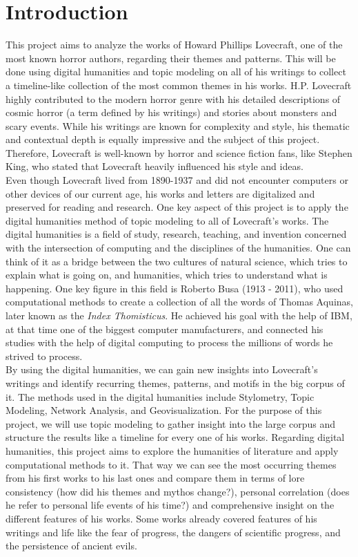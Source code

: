 \section{Introduction}

This project aims to analyze the works of Howard Phillips Lovecraft, one of the most known horror 
authors, regarding their themes and patterns. This will be done using digital humanities and topic 
modeling on all of his writings to collect a timeline-like collection of the most common themes in 
his works. H.P. Lovecraft highly contributed to the modern horror genre with his detailed descriptions 
of cosmic horror (a term defined by his writings) and stories about monsters and scary events. While 
his writings are known for complexity and style, his thematic and contextual depth is equally impressive 
and the subject of this project. Therefore, Lovecraft is well-known by horror and science fiction fans, 
like Stephen King, who stated that Lovecraft heavily influenced his style and ideas.\\

Even though Lovecraft lived from 1890-1937 and did not encounter computers or other devices of our 
current age, his works and letters are digitalized and preserved for reading and research. One key 
aspect of this project is to apply the digital humanities method of topic modeling to all of 
Lovecraft's works. The digital humanities is a field of study, research, teaching, and invention 
concerned with the intersection of computing and the disciplines of the humanities. One can think 
of it as a bridge between the two cultures of natural science, which tries to explain what is going 
on, and humanities, which tries to understand what is happening. One key figure in this field is 
Roberto Busa (1913 - 2011), who used computational methods to create a collection of all the words 
of Thomas Aquinas, later known as the \textit{Index Thomisticus}. He achieved his goal with the help of IBM, 
at that time one of the biggest computer manufacturers, and connected his studies with the help of 
digital computing to process the millions of words he strived to process.\\

By using the digital humanities, we can gain new insights into Lovecraft's writings and identify 
recurring themes, patterns, and motifs in the big corpus of it. The methods used in the digital 
humanities include Stylometry, Topic Modeling, Network Analysis, and Geovisualization. For the 
purpose of this project, we will use topic modeling to gather insight into the large corpus and 
structure the results like a timeline for every one of his works. Regarding digital humanities, 
this project aims to explore the humanities of literature and apply computational methods to it. 
That way we can see the most occurring themes from his first works to his last ones and compare 
them in terms of lore consistency (how did his themes and mythos change?), personal correlation 
(does he refer to personal life events of his time?) and comprehensive insight on the different 
features of his works. Some works already covered features of his writings and life like the fear 
of progress, the dangers of scientific progress, and the persistence of ancient evils.
